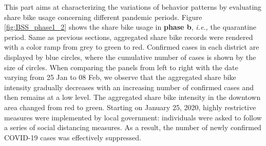 \documentclass[ijgi,submit,moreauthors,pdftex]{Definitions/mdpi}
\begin{document}
This part aims at characterizing the variations of behavior patterns by evaluating share bike usage concerning different pandemic periods.
Figure \ref{fig:BSS_phase1_2} shows the share bike usage in \textbf{phase b}, \textit{i.e.,} the quarantine period.
Same as previous sections, aggregated share bike records were rendered with a color ramp from grey to green to red.
Confirmed cases in each district are displayed by blue circles, where the cumulative number of cases is shown by the size of circles.
When comparing the panels from left to right with the date varying from 25 Jan to 08 Feb, we observe that the aggregated share bike intensity gradually decreases with an increasing number of confirmed cases and then remains at a low level.
The aggregated share bike intensity in the downtown area changed from red to green.
Starting on January 25, 2020, highly restrictive measures were implemented by local government: individuals were asked to follow a series of social distancing measures.
As a result, the number of newly confirmed COVID-19 cases was effectively suppressed.
\end{document}
